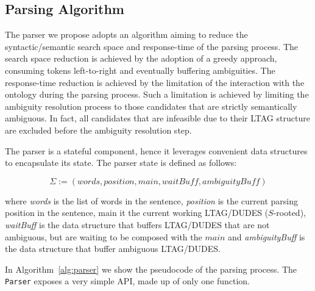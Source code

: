 \subsection{Parsing Algorithm}
\label{sec:parsing-algorithm}

The parser we propose adopts an algorithm aiming to reduce the syntactic/semantic search space and response-time of the parsing process.
%
The search space reduction is achieved by the adoption of a greedy approach, consuming tokens left-to-right and eventually buffering ambiguities.
%
The response-time reduction is achieved by the limitation of the interaction with the ontology during the parsing process. 
%
Such a limitation is achieved by limiting the ambiguity resolution process to those candidates that are strictly semantically ambiguous.
%
In fact, all candidates that are infeasible due to their LTAG structure are excluded before the ambiguity resolution step. 

The parser is a stateful component, hence it leverages convenient data structures to encapsulate its state.
%
The parser state is defined as follows:

\begin{equation}
\label{eqn:parser-state}
	\Sigma:=(words,position,main,waitBuff,ambiguityBuff)
\end{equation}

where
\textit{words} is the list of words in the sentence,
\textit{position} is the current parsing position in the sentence,
main it the current working LTAG/DUDES ($S$-rooted),
\textit{waitBuff} is the data structure that buffers LTAG/DUDES that are not ambiguous, but are waiting to be composed with the $main$ and 
\textit{ambiguityBuff} is the data structure that buffer ambiguous LTAG/DUDES.

In Algorithm~\ref{alg:parser} we show the pseudocode of the parsing process.
%
The \texttt{Parser} exposes a very simple API, made up of only one function.

